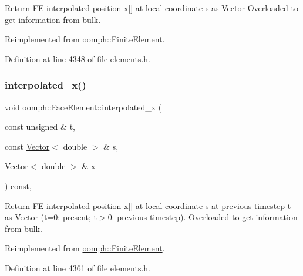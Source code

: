 Return FE interpolated position x\mbox{[}\mbox{]} at local coordinate s as \hyperlink{classoomph_1_1Vector}{Vector} Overloaded to get information from bulk. 



Reimplemented from \hyperlink{classoomph_1_1FiniteElement_a8a14a32734ecc92987fdd5dbd34227d2}{oomph\+::\+Finite\+Element}.



Definition at line 4348 of file elements.\+h.

\mbox{\label{classoomph_1_1FaceElement_a73520230d5b6cabea8ae25ad4b762f12}} 
\subsubsection{\texorpdfstring{interpolated\+\_\+x()}{interpolated\_x()}\hspace{0.1cm}{\footnotesize\ttfamily [4/4]}}
{\footnotesize\ttfamily void oomph\+::\+Face\+Element\+::interpolated\+\_\+x (\begin{DoxyParamCaption}\item[{const unsigned \&}]{t,  }\item[{const \hyperlink{classoomph_1_1Vector}{Vector}$<$ double $>$ \&}]{s,  }\item[{\hyperlink{classoomph_1_1Vector}{Vector}$<$ double $>$ \&}]{x }\end{DoxyParamCaption}) const\hspace{0.3cm}{\ttfamily [inline]}, {\ttfamily [virtual]}}



Return FE interpolated position x\mbox{[}\mbox{]} at local coordinate s at previous timestep t as \hyperlink{classoomph_1_1Vector}{Vector} (t=0\+: present; t$>$0\+: previous timestep). Overloaded to get information from bulk. 



Reimplemented from \hyperlink{classoomph_1_1FiniteElement_af099c245fe3e3ec7ac75a78de31ac200}{oomph\+::\+Finite\+Element}.



Definition at line 4361 of file elements.\+h.

\mbox{\label{classoomph_1_1FaceElement_a919d0d76746eaa78a8a3c7f75f99a9e5}} 
